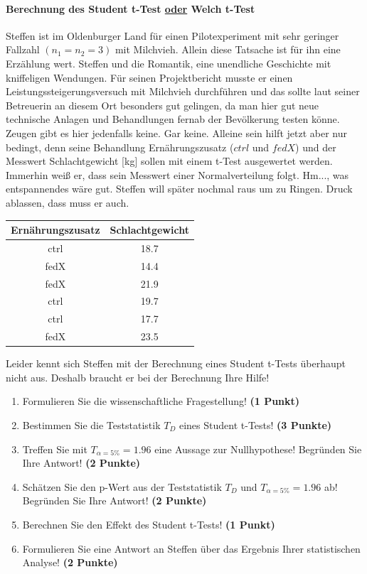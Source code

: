 \documentclass[a4paper, 9pt]{scrartcl}\usepackage[]{graphicx}\usepackage[]{xcolor}
\begin{document}
\ifcollection
\paragraph{Berechnung des Student t-Test \underline{oder} Welch t-Test}
\fi

Steffen ist im Oldenburger Land für einen Pilotexperiment mit sehr geringer Fallzahl $(n_1 = n_2 = 3)$ mit Milchvieh. Allein diese Tatsache ist für ihn eine Erzählung wert. Steffen und die Romantik, eine unendliche Geschichte mit kniffeligen Wendungen.  Für seinen Projektbericht musste er einen Leistungssteigerungsversuch mit Milchvieh durchführen und das sollte laut seiner Betreuerin an diesem Ort besonders gut gelingen, da man hier gut neue technische Anlagen und Behandlungen fernab der Bevölkerung testen könne. Zeugen gibt es hier jedenfalls keine. Gar keine.  Alleine sein hilft jetzt aber nur bedingt, denn seine Behandlung Ernährungszusatz ($ctrl$ und $fedX$) und der Messwert Schlachtgewicht [kg] sollen mit einem t-Test ausgewertet werden. Immerhin weiß er, dass sein Messwert einer Normalverteilung folgt. Hm..., was entspannendes wäre gut. Steffen will später nochmal raus um zu Ringen. Druck ablassen, dass muss er auch.

\begin{table}[!h]
\centering
\begin{tabular}{cc}
\toprule
Ernährungszusatz & Schlachtgewicht\\
\midrule
ctrl & 18.7\\
fedX & 14.4\\
fedX & 21.9\\
ctrl & 19.7\\
ctrl & 17.7\\
\addlinespace
fedX & 23.5\\
\bottomrule
\end{tabular}
\end{table}



Leider kennt sich Steffen mit der Berechnung eines Student t-Tests überhaupt nicht aus. Deshalb braucht er bei der Berechnung Ihre Hilfe!

\begin{enumerate}
  \item Formulieren Sie die wissenschaftliche Fragestellung! \textbf{(1 Punkt)}
  \item Bestimmen Sie die Teststatistik $T_{D}$ eines Student t-Tests! \textbf{(3 Punkte)}
  \item Treffen Sie mit $T_{\alpha = 5\%} = 1.96$ eine Aussage zur Nullhypothese! Begründen Sie Ihre Antwort! \textbf{(2 Punkte)}
  \item Schätzen Sie den p-Wert aus der Teststatistik $T_{D}$ und $T_{\alpha = 5\%} = 1.96$ ab! Begründen Sie Ihre Antwort! \textbf{(2 Punkte)}
  \item Berechnen Sie den Effekt des Student t-Tests! \textbf{(1 Punkt)}
  \item Formulieren Sie eine Antwort an Steffen über das Ergebnis Ihrer statistischen Analyse! \textbf{(2 Punkte)}
\end{enumerate} 
\clearpage
\end{document}
